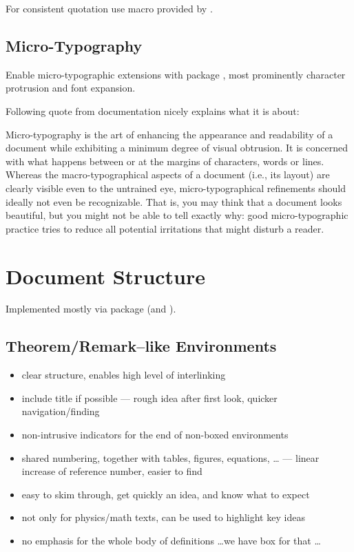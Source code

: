 For consistent quotation use \macro{\enquote} macro provided by .

\subsection{\texorpdfstring{Micro-\!Typography}{Micro-Typography}}%
\label{sub:Micro-Typography}

Enable micro-typographic extensions with package , most prominently character protrusion and font expansion.

Following quote from  documentation nicely explains what it is about:
\begin{displayquote}
    Micro-typography is the art of enhancing the appearance and readability of a
    document while exhibiting a minimum degree of visual obtrusion.
    It is concerned with what happens between or at the margins of characters, words or lines.
    Whereas the macro-typographical aspects of a document (i.e., its layout) are clearly visible even to the untrained eye, micro-typographical refinements should ideally not even be recognizable.
    That is, you may think that a document looks beautiful, but you might not be able to tell exactly why: good micro-typographic practice tries to reduce all potential irritations that might disturb a reader.
\end{displayquote}


\section{Document Structure}%
\label{sec:Document Structure}

Implemented mostly via  package (and ).

\subsection{Theorem/Remark--like Environments}%
\label{sub:Theorem/Remark--like Environments}

\begin{itemize}
    \item clear structure, enables high level of interlinking
    \item include title if possible --- rough idea after first look, quicker navigation/finding
    \item non-intrusive indicators for the end of non-boxed environments
    \item shared numbering, together with tables, figures, equations, \ldots
          --- linear increase of reference number, easier to find
    \item easy to skim through, get quickly an idea, and know what to expect
    \item not only for physics/math texts, can be used to highlight key ideas
    \item no emphasis for the whole body of definitions \ldots we have box for that \ldots
\end{itemize}

